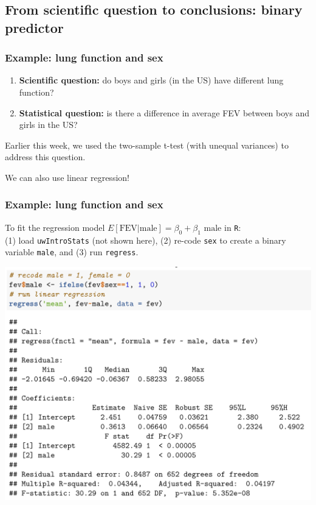 \documentclass[12pt, 
hyperref={colorlinks=true, linkcolor=blue, urlcolor=cyan}]{beamer}
\begin{document}
\subsection{From scientific question to conclusions: binary predictor}
\begin{frame}
\frametitle{Example: lung function and sex}

\begin{enumerate}
\item \textbf{Scientific question:} do boys and girls (in the US) have different lung function?
\item \textbf{Statistical question:} is there a difference in average FEV between boys and girls in the US?
\end{enumerate} 

Earlier this week, we used the two-sample t-test (with unequal variances) to address this question.

We can also use linear regression!
\end{frame}

\begin{frame}
\frametitle{Example: lung function and sex}
To fit the regression model \color{blue} $E[\text{FEV}|\text{male}] = \beta_0 + \beta_1 \text{ male}$ \color{black} in \texttt{R}:\\ (1) load \texttt{uwIntroStats} (not shown here), (2) re-code \texttt{sex} to create a binary variable \texttt{male}, and (3) run \texttt{regress}. \vspace{-0.5cm}

\center
\includegraphics[width=0.6\paperwidth]{./plots/regress_fev_vs_sex}

\end{frame}
\end{document}
